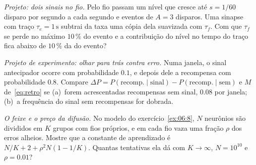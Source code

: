 \begin{exercise}[\lvlB]
\label{ex:07:6}
\emph{Projeto: dois sinais no fio.} Pelo fio  passam um nível que cresce até $s=1/60$ disparo por segundo a cada segundo e eventos de $A=3$ disparos. Uma sinapse com traço $\tau_e=1\,\text{s}$ subtrai da taxa uma cópia dela suavizada com $\tau_f$. Com que $\tau_f$ se perde no máximo $10\,\%$ do evento e a contribuição do nível no tempo do traço fica abaixo de $10\,\%$ da do evento?
\end{exercise}

\begin{exercise}[\lvlB]
\label{ex:07:7}
\emph{Projeto de experimento: olhar para trás contra erro.} Numa janela, o sinal antecipador ocorre com probabilidade $0.1$, e depois dele a recompensa com probabilidade $0.8$. Compare $\Delta P=P(\text{recomp.}\mid\text{sinal})-P(\text{recomp.}\mid\text{sem})$ e $M$ de~\eqref{eq:retro} se (a)~forem acrescentadas recompensas sem sinal, $0.08$ por janela; (b)~a frequência do sinal sem recompensas for dobrada.
\end{exercise}

\begin{exercise}[\lvlC]
\label{ex:07:8}
\emph{O feixe e o preço da difusão.} No modelo do exercício~\ref{ex:06:8}, $N$ neurônios são divididos em $K$ grupos com fios próprios, e em cada fio vaza uma fração $\rho$ dos erros alheios. Mostre que a constante de aprendizado é $N/K+2+\rho^2N(1-1/K)$. Quantas tentativas ela dá com $K\to\infty$, $N=10^{10}$ e $\rho=0.01$?
\end{exercise}
